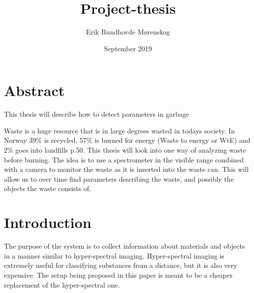 \documentclass{article}
\title{Project-thesis}
\author{Erik Rundhovde M\o renskog}
\date{September 2019}
\begin{document}
\maketitle

\section{Abstract}
This thesis will describe how to detect parameters in garbage 

Waste is a huge resource that is in large degrees wasted in todays society. In Norway 39\% is recycled, 57\% is burned for energy (Waste to energy or WtE) and 2\% goes into landfills \cite{EnvironmentGlance20152015} p.50. This thesis will look into one way of analyzing waste before burning. The idea is to use a spectrometer in the visible range combined with a camera to monitor the waste as it is inserted into the waste can. This will allow us to over time find parameters describing the waste, and possibly the objects the waste consists of. 


\section{Introduction}
The purpose of the system is to collect information about materials and objects in a manner similar to hyper-spectral imaging. Hyper-spectral imaging is extremely useful for classifying substances from a distance, but it is also very expensive. The setup being proposed in this paper is meant to be a cheaper replacement of the hyper-spectral one. 
\end{document}
